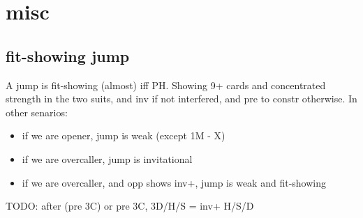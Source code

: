 \section{misc}

\subsection{fit-showing jump}

A jump is fit-showing (almost) iff PH. Showing 9+ cards and concentrated strength in the two suits, and
inv if not interfered, and pre to constr otherwise. In other senarios:

\begin{itemize}
    \setlength\itemsep{0pt}
    \item if we are opener, jump is weak (except 1M - X)
    \item if we are overcaller, jump is invitational
    \item if we are overcaller, and opp shows inv+, jump is weak and fit-showing
\end{itemize}

TODO: after (pre 3C) or pre 3C, 3D/H/S = inv+ H/S/D